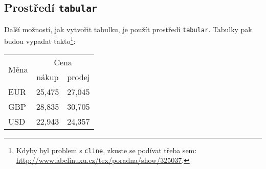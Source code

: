 \documentclass[11pt]{article}
\begin{document}
        \subsection{Prostředí \verb|tabular|}
            Další možností, jak vytvořit tabulku, je použít prostředí \verb|tabular|. Tabulky pak budou vypadat takto\footnote[1]{Kdyby byl problem s \verb|cline|, zkuste se podívat třeba sem: \href{http://www.abclinuxu.cz/tex/poradna/show/325037}{http://www.abclinuxu.cz/tex/poradna/show/325037}.}:

            \begin{center}
                \begin{tabular}{|l|c|c|}
                    \hline
                    \multirow{2}{*}{Měna} & \multicolumn{2}{|c|}{Cena} \\

                                            \cline { 2 - 3 }
                                            & nákup     & prodej \\

                    \hline
                                EUR         & 25,475    & 27,045    \\
                                GBP         & 28,835    & 30,705    \\
                                USD         & 22,943    & 24,357    \\
                    \hline
                \end{tabular}
            \end{center}
\end{document}

